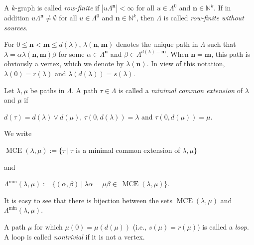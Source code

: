 \documentclass[a4paper,reqno,12pt]{amsart}
\numberwithin{equation}{section}
\theoremstyle{definition}
\theoremstyle{remark}
\newcommand{\MCE}{\operatorname{MCE}}
\newcommand{\N}{\mathbf{n}}
\newcommand{\M}{\mathbf{m}}
\begin{document}
A $k$-graph is called \emph{row-finite} if $|u\Lambda^\N|<\infty$ for all $u\in \Lambda^0$ and $\N\in \mathbb{N}^k$. If in addition $u\Lambda^\N\neq \emptyset$ for all $u\in \Lambda^0$ and $\N\in \mathbb{N}^k$, then $\Lambda$ is called \emph{row-finite without sources}.

For $0\le \N<\M\le d(\lambda)$, $\lambda(\N,\M)$ denotes the unique path in $\Lambda$ such that $\lambda=\alpha \lambda(\N,\M)\beta$ for some $\alpha\in \Lambda^\N$ and $\beta\in \Lambda^{d(\lambda)-\M}$. When $\N=\M$, this path is obviously a vertex, which we denote by $\lambda(\N)$. In view of this notation, $\lambda(0)=r(\lambda)$ and $\lambda(d(\lambda))=s(\lambda)$. 

Let $\lambda,\mu$ be paths in $\Lambda$. A path $\tau\in \Lambda$ is called a \emph{minimal common extension} of $\lambda$ and $\mu$ if 

\begin{center}
    $d(\tau)=d(\lambda)\vee d(\mu)$, $\tau(0,d(\lambda))=\lambda$ and $\tau(0,d(\mu))=\mu$.
\end{center}
We write 
\begin{center}
$\MCE(\lambda,\mu):=\{\tau~|~\tau$ is a minimal common extension of $\lambda,\mu\}$   
\end{center}
and 
\begin{center}
$\Lambda^{\min}(\lambda,\mu):=\{(\alpha,\beta)~|~\lambda\alpha=\mu\beta\in~ \MCE(\lambda,\mu)\}$.
\end{center}
It is easy to see that there is bijection between the sets $\MCE(\lambda,\mu)$ and $\Lambda^{\min}(\lambda,\mu)$. 

A path $\mu$ for which $\mu(0)=\mu(d(\mu))$ (i.e., $s(\mu)=r(\mu)$) is called a \emph{loop}. A loop is called \emph{nontrivial} if it is not a vertex. 
\end{document}
